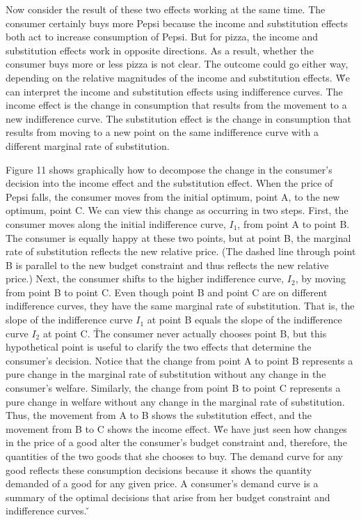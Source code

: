 Now consider the result of these two effects working at the same time. The consumer certainly buys more Pepsi because
the income and substitution effects both act to increase consumption of Pepsi. But for pizza, the income and
substitution effects work in opposite directions. As a result, whether the consumer buys more or less pizza is not
clear. The outcome could go either way, depending on the relative magnitudes of the income and substitution effects. \v

We can interpret the income and substitution effects using indifference curves. The income effect is the change in
consumption that results from the movement to a new indifference curve. The substitution effect is the change in
consumption that results from moving to a new point on the same indifference curve with a different marginal rate of
substitution.


Figure 11 shows graphically how to decompose the change in the consumer's decision into the income effect and the
substitution effect. When the price of Pepsi falls, the consumer moves from the initial optimum, point A, to the new
optimum, point C. We can view this change as occurring in two steps. First, the consumer moves along the initial
indifference curve, $I_1$, from point A to point B. The consumer is equally happy at these two points, but at point
B, the marginal rate of substitution reflects the new relative price. (The dashed line through point B is parallel to
the new budget constraint and thus reflects the new relative price.) Next, the consumer shifts to the higher
indifference curve, $I_2$, by moving from point B to point C. Even though point B and point C are on different
indifference curves, they have the same marginal rate of substitution. That is, the slope of the indifference curve
$I_1$ at point B equals the slope of the indifference curve $I_2$ at point C. \v

The consumer never actually chooses point B, but this hypothetical point is useful to clarify the two effects that
determine the consumer's decision. Notice that the change from point A to point B represents a pure change in the
marginal rate of substitution without any change in the consumer's welfare. Similarly, the change from point B to
point C represents a pure change in welfare without any change in the marginal rate of substitution. Thus, the
movement from A to B shows the substitution effect, and the movement from B to C shows the income effect. \v

We have just seen how changes in the price of a good alter the consumer's budget constraint and, therefore, the
quantities of the two goods that she chooses to buy. The demand curve for any good reflects these consumption
decisions because it shows the quantity demanded of a good for any given price. A consumer's demand curve is a
summary of the optimal decisions that arise from her budget constraint and indifference curves. \v

